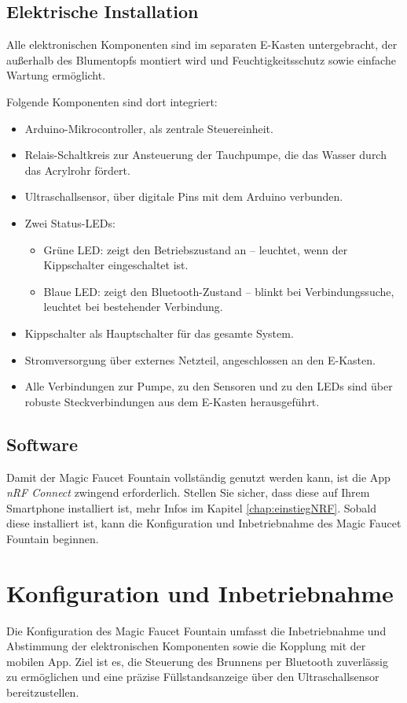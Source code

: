 \subsection{Elektrische Installation}
Alle elektronischen Komponenten sind im separaten E-Kasten untergebracht, der außerhalb des Blumentopfs montiert wird und Feuchtigkeitsschutz sowie einfache Wartung ermöglicht.

Folgende Komponenten sind dort integriert:
\begin{itemize}
    \item Arduino-Mikrocontroller, als zentrale Steuereinheit.
    \item Relais-Schaltkreis zur Ansteuerung der Tauchpumpe, die das Wasser durch das Acrylrohr fördert.
    \item Ultraschallsensor, über digitale Pins mit dem Arduino verbunden.
    \item Zwei Status-LEDs:
    	\begin{itemize}
        \item Grüne LED: zeigt den Betriebszustand an – leuchtet, wenn der Kippschalter eingeschaltet ist.
        \item Blaue LED: zeigt den Bluetooth-Zustand – blinkt bei Verbindungssuche, leuchtet bei bestehender Verbindung.
        \end{itemize}
    \item Kippschalter als Hauptschalter für das gesamte System.
    \item Stromversorgung über externes Netzteil, angeschlossen an den E-Kasten.
    \item Alle Verbindungen zur Pumpe, zu den Sensoren und zu den LEDs sind über robuste Steckverbindungen aus dem E-Kasten herausgeführt.
\end{itemize}

\subsection{Software}
Damit der Magic Faucet Fountain vollständig genutzt werden kann, ist die App \textit{nRF Connect} zwingend erforderlich. Stellen Sie sicher, dass diese auf Ihrem Smartphone installiert ist, mehr Infos im Kapitel \ref{chap:einstiegNRF}. Sobald diese installiert ist, kann die Konfiguration und Inbetriebnahme des Magic Faucet Fountain beginnen.

\section{Konfiguration und Inbetriebnahme}
Die Konfiguration des Magic Faucet Fountain umfasst die Inbetriebnahme und Abstimmung der elektronischen Komponenten sowie die Kopplung mit der mobilen App. Ziel ist es, die Steuerung des Brunnens per Bluetooth zuverlässig zu ermöglichen und eine präzise Füllstandsanzeige über den Ultraschallsensor bereitzustellen.

